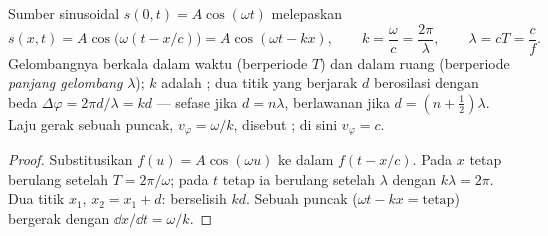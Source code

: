 \begin{proposition}\label{prop:b1:wave-propagation:sinusoidal}
Sumber sinusoidal $s(0, t) = A\cos(\omega t)$ melepaskan
\[
s(x, t) = A\cos\!\big(\omega(t - x/c)\big) = A\cos(\omega t - kx),
\qquad k = \frac{\omega}{c} = \frac{2\pi}{\lambda},
\qquad \lambda = cT = \frac{c}{f}.
\]
Gelombangnya berkala dalam waktu (berperiode $T$) dan dalam ruang
(berperiode \emph{panjang gelombang} $\lambda$); $k$ adalah
\emph{}; dua titik yang berjarak $d$ berosilasi dengan
beda  $\Delta\varphi = 2\pi d/\lambda = kd$ --- sefase jika
$d = n\lambda$, berlawanan  jika $d = (n + \tfrac12)\lambda$. Laju
gerak sebuah puncak, $v_\varphi = \omega/k$, disebut \emph{}; di sini $v_\varphi = c$.
\end{proposition}

\begin{proof}
Substitusikan $f(u) = A\cos(\omega u)$ ke dalam $f(t - x/c)$. Pada $x$
tetap  berulang setelah $T = 2\pi/\omega$; pada $t$ tetap ia
berulang setelah $\lambda$ dengan $k\lambda = 2\pi$. Dua titik $x_1$,
$x_2 = x_1 + d$:  berselisih $kd$. Sebuah puncak
($\omega t - kx = \text{tetap}$) bergerak dengan $\dd x/\dd t = \omega/k$.
\end{proof}

